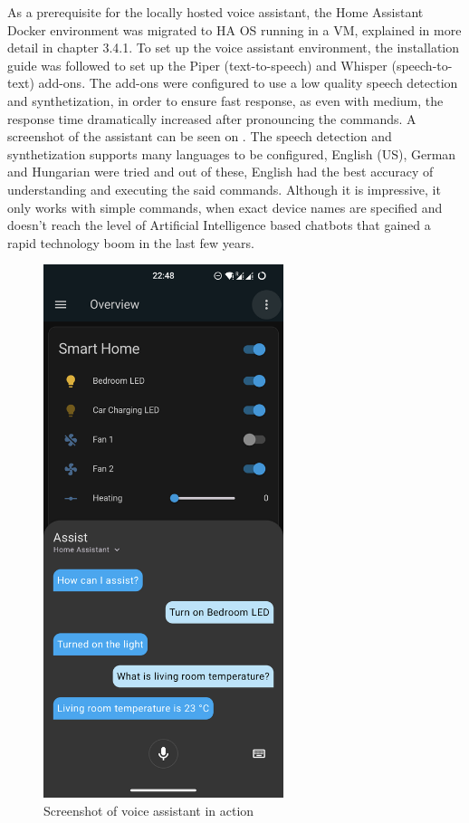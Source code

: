 As a prerequisite for the locally hosted voice assistant, the Home Assistant Docker environment was migrated to HA OS running in a VM, explained in more detail in chapter 3.4.1. To set up the voice assistant environment, the installation guide was followed to set up the Piper (text-to-speech) and Whisper (speech-to-text) add-ons. \cite{HALocalAssist} The add-ons were configured to use a low quality speech detection and synthetization, in order to ensure fast response, as even with medium, the response time dramatically increased after pronouncing the commands. A screenshot of the assistant can be seen on . The speech detection and synthetization supports many languages to be configured, English (US), German and Hungarian were tried and out of these, English had the best accuracy of understanding and executing the said commands. Although it is impressive, it only works with simple commands, when exact device names are specified and doesn't reach the level of Artificial Intelligence based chatbots that gained a rapid technology boom in the last few years.

\begin{figure}[!ht]
  \centering
  \includegraphics[width=70mm, keepaspectratio]{figures/homeassistant_android_assist.png}
  \caption{Screenshot of voice assistant in action}
  \label{fig:HAandroidVoiceAssistant}
\end{figure}
